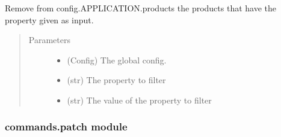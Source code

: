 \documentclass[a4paper,10pt,english]{sphinxmanual}
\begin{document}
\begin{fulllineitems}
\label{\detokenize{apidoc_commands/commands:commands.package.update_config}}
Remove from config.APPLICATION.products the products 
that have the property given as input.
\begin{quote}\begin{description}
\item[{Parameters}] \leavevmode\begin{itemize}
\item {} 
 \textendash{} (Config) The global config.

\item {} 
 \textendash{} (str) The property to filter

\item {} 
 \textendash{} (str) The value of the property to filter

\end{itemize}

\end{description}\end{quote}

\end{fulllineitems}



\subsubsection{commands.patch module}
\label{\detokenize{apidoc_commands/commands:module-commands.patch}}\label{\detokenize{apidoc_commands/commands:commands-patch-module}}
\end{document}

